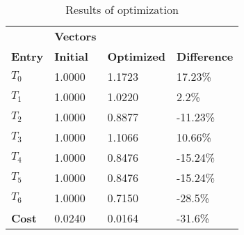 \begin{table}[h!]
\centering
\begin{tabular}{llll}
\textbf{}      & \cellcolor[HTML]{EFEFEF}\textbf{Vectors} & \textbf{} & \textbf{}         \\
\rowcolor[HTML]{EFEFEF} 
\textbf{Entry} & \textbf{Initial} & \textbf{Optimized} & \textbf{Difference} \\
$T_0$ & 1.0000 & 1.1723 & 17.23\% \\ 
$T_1$ & 1.0000 & 1.0220 & 2.2\% \\ 
$T_2$ & 1.0000 & 0.8877 & -11.23\% \\ 
$T_3$ & 1.0000 & 1.1066 & 10.66\% \\ 
$T_4$ & 1.0000 & 0.8476 & -15.24\% \\ 
$T_5$ & 1.0000 & 0.8476 & -15.24\% \\ 
$T_6$ & 1.0000 & 0.7150 & -28.5\% \\ 
\rowcolor[HTML]{EFEFEF} 
\textbf{Cost}  & 0.0240 & 0.0164 & -31.6\% \\ 
\end{tabular}
\caption{Results of optimization}
\label{tab:OptimizationAnalysis}
\end{table}